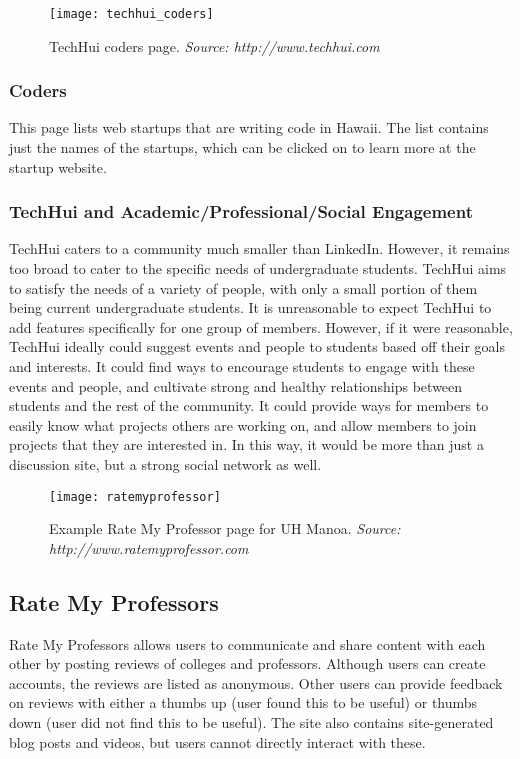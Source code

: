\begin{figure}[h]
\centering
\texttt{[image: techhui\_coders]}
\caption{TechHui coders page. \textit{Source: http://www.techhui.com}}
\end{figure}
\subsubsection{Coders}
This page lists web startups that are writing code in Hawaii. The list contains just the names of the startups, which can be clicked on to learn more at the startup website.

\subsubsection{TechHui and Academic/Professional/Social Engagement}
TechHui caters to a community much smaller than LinkedIn. However, it remains too broad to cater to the specific needs of undergraduate students. TechHui aims to satisfy the needs of a variety of people, with only a small portion of them being current undergraduate students. It is unreasonable to expect TechHui to add features specifically for one group of members. However, if it were reasonable, TechHui ideally could suggest events and people to students based off their goals and interests. It could find ways to encourage students to engage with these events and people, and cultivate strong and healthy relationships between students and the rest of the community. It could provide ways for members to easily know what projects others are working on, and allow members to join projects that they are interested in. In this way, it would be more than just a discussion site, but a strong social network as well. 

\begin{figure}[h]
\centering
\texttt{[image: ratemyprofessor]}
\caption{Example Rate My Professor page for UH Manoa. \textit{Source: http://www.ratemyprofessor.com}}
\end{figure}
\subsection{Rate My Professors}
Rate My Professors allows users to communicate and share content with each other by posting reviews of colleges and professors. \cite{RateMyProfessors} Although users can create accounts, the reviews are listed as anonymous. Other users can provide feedback on reviews with either a thumbs up (user found this to be useful) or thumbs down (user did not find this to be useful). The site also contains site-generated blog posts and videos, but users cannot directly interact with these.


